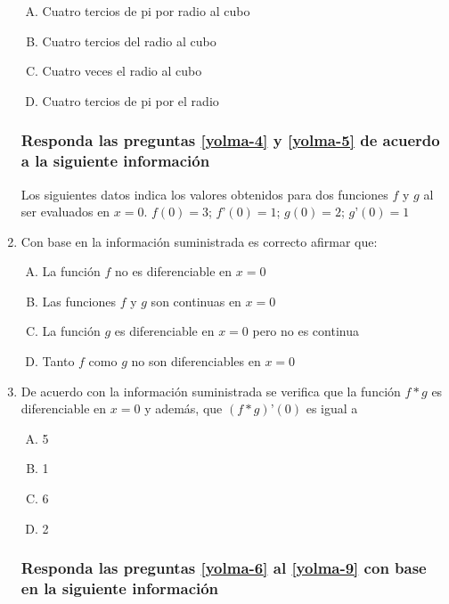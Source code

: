\begin{enumerate}
\begin{enumerate}[(A)]
\item  Cuatro tercios de pi por radio al cubo
\item Cuatro tercios del radio al cubo
\item Cuatro veces el radio al cubo
\item Cuatro tercios de pi por el radio
\end{enumerate}

\subsubsection*{Responda las preguntas \ref{yolma-4} y \ref{yolma-5} de acuerdo a la siguiente información}

Los siguientes datos indica los valores obtenidos para dos funciones $f$ y $g$ al ser evaluados en $x=0$.  $f(0)=3$; $f’(0)=1$; $g(0)=2$; $g’(0)=1$

\item Con base en la información suministrada es correcto afirmar que: \label{yolma-4}\\

\begin{enumerate}[(A)]
\item  La función $f$ no es diferenciable en $x=0$
\item Las funciones $f$ y $g$ son continuas en $x=0$
\item La función $g$ es diferenciable en $x=0$ pero no es continua
\item Tanto $f$ como $g$ no son diferenciables en $x=0$
\end{enumerate}


\item De acuerdo con la información suministrada se verifica que la función $f*g$ es diferenciable en $x=0$ y además, que $(f*g)’(0)$ es igual a \label{yolma-5}\\

\begin{enumerate}[(A)]
\item  5
\item 1
\item 6
\item 2
\end{enumerate}


\subsubsection*{Responda las preguntas \ref{yolma-6}  al \ref{yolma-9} con base en la siguiente información}


\end{enumerate}
